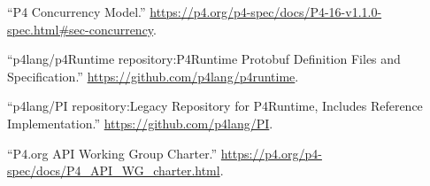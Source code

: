\documentclass[11pt]{article}
\begin{document}
{{\begin{thebibliography}{35}
\mdbibitemlabel{{}[13]}\textquotedblleft{}P4 Concurrency Model.\textquotedblright{} \href{https://p4.org/p4-spec/docs/P4-16-v1.1.0-spec.html\%23sec-concurrency}{{\ttfamily https://\hspace{0pt}p4.\hspace{0pt}org/\hspace{0pt}p4-\hspace{0pt}spec/\hspace{0pt}docs/\hspace{0pt}P4-\hspace{0pt}16-\hspace{0pt}v1.\hspace{0pt}1.\hspace{0pt}0-\hspace{0pt}spec.\hspace{0pt}html\#\hspace{0pt}sec-\hspace{0pt}concurrency}}.\label{p4concurrency}%

\mdbibitemlabel{{}[14]}\textquotedblleft{}p4lang/p4Runtime repository:P4Runtime Protobuf Definition Files and Specification.\textquotedblright{} \href{https://github.com/p4lang/p4runtime}{{\ttfamily https://\hspace{0pt}github.\hspace{0pt}com/\hspace{0pt}p4lang/\hspace{0pt}p4runtime}}.\label{p4runtimerepo}%

\mdbibitemlabel{{}[15]}\textquotedblleft{}p4lang/PI repository:Legacy Repository for P4Runtime, Includes Reference Implementation.\textquotedblright{} \href{https://github.com/p4lang/PI}{{\ttfamily https://\hspace{0pt}github.\hspace{0pt}com/\hspace{0pt}p4lang/\hspace{0pt}PI}}.\label{pirepo}%

\mdbibitemlabel{{}[16]}\textquotedblleft{}P4.org API Working Group Charter.\textquotedblright{} \href{https://p4.org/p4-spec/docs/P4_API_WG_charter.html}{{\ttfamily https://\hspace{0pt}p4.\hspace{0pt}org/\hspace{0pt}p4-\hspace{0pt}spec/\hspace{0pt}docs/\hspace{0pt}P4\_\hspace{0pt}API\_\hspace{0pt}WG\_\hspace{0pt}charter.\hspace{0pt}html}}.\label{p4apiwgcharter}%


\end{thebibliography}}}
\end{document}
